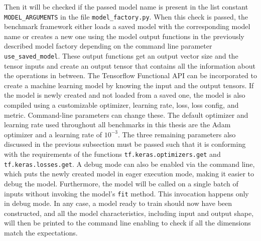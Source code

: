 \documentclass[draft,final]{vutinfth} %
\begin{document}
    Then it will be checked if the passed model name is present in the list constant \texttt{MODEL\_ARGUMENTS} in the file \texttt{model\_factory.py}.
    When this check is passed, the benchmark framework either loads a saved model with the corresponding model name or creates a new one using the model output functions in the previously described model factory depending on the command line parameter \texttt{use\_saved\_model}.
    These output functions get an output vector size and the tensor inputs and create an output tensor that contains all the information about the operations in between.
    The Tensorflow \cite{Tensorflow} Functional API can be incorporated to create a machine learning model by knowing the input and the output tensors.
    If the model is newly created and not loaded from a saved one, the model is also compiled using a customizable optimizer, learning rate, loss, loss config, and metric.
    Command-line parameters can change these.
    The default optimizer and learning rate used throughout all benchmarks in this thesis are the Adam optimizer \cite{Adam} and a learning rate of $10^{-3}$.
    The three remaining parameters also discussed in the previous subsection must be passed such that it is conforming with the requirements of the functions \texttt{tf.keras.optimizers.get} and \texttt{tf.keras.losses.get}.
    A debug mode can also be enabled via the command line, which puts the newly created model in eager execution mode, making it easier to debug the model. Furthermore, the model will be called on a single batch of inputs without invoking the model's \texttt{fit} method. This invocation happens only in debug mode.
    In any case, a model ready to train should now have been constructed, and all the model characteristics, including input and output shape, will then be printed to the command line enabling to check if all the dimensions match the expectations.
\end{document}
